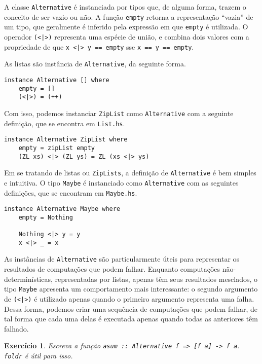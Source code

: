 \documentclass[a4paper]{article}
\newtheorem{exercicio}{Exercício}
\begin{document}
A classe \texttt{Alternative} é instanciada por tipos que, de alguma forma, trazem o conceito de ser vazio ou não.
A função \texttt{empty} retorna a representação ``vazia'' de um tipo, que geralmente é inferido pela expressão em que \texttt{empty} é utilizada.
O operador \texttt{(<|>)} representa uma espécie de união, e combina dois valores com a propriedade de que \texttt{x <|> y == empty} sse \mbox{\texttt{x == y == empty}}.

As listas são instância de \texttt{Alternative}, da seguinte forma.

\begin{verbatim}
instance Alternative [] where
	empty = []
	(<|>) = (++)
\end{verbatim}

Com isso, podemos instanciar \texttt{ZipList} como \texttt{Alternative} com a seguinte definição, que se encontra em \texttt{List.hs}.

\begin{verbatim}
instance Alternative ZipList where
	empty = zipList empty
	(ZL xs) <|> (ZL ys) = ZL (xs <|> ys)
\end{verbatim}

Em se tratando de listas ou \texttt{ZipLists}, a definição de \texttt{Alternative} é bem simples e intuitiva.
O tipo \texttt{Maybe} é instanciado como \texttt{Alternative} com as seguintes definições, que se encontram em \texttt{Maybe.hs}.

\begin{verbatim}
instance Alternative Maybe where
	empty = Nothing
	
	Nothing <|> y = y
	x <|> _ = x
\end{verbatim}

As instâncias de \texttt{Alternative} são particularmente úteis para representar os resultados de computações que podem falhar.
Enquanto computações não-determinísticas, representadas por listas, apenas têm seus resultados mesclados, o tipo \texttt{Maybe} apresenta um comportamento mais interessante:
o segundo argumento de \texttt{(<|>)} é utilizado apenas quando o primeiro argumento representa uma falha.
Dessa forma, podemos criar uma sequência de computações que podem falhar, de tal forma que cada uma delas é executada apenas quando todas as anteriores têm falhado.

\begin{exercicio}
	Escreva a função \emph{\texttt{asum :: Alternative f => [f a] -> f a}}.
	\emph{\texttt{foldr}} é útil para isso.
\end{exercicio}
\end{document}
